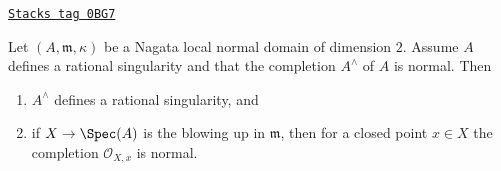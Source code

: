 \begin{lemma}
\label{resolve-lemma-blowup-still-good}
\href{https://stacks.math.columbia.edu/tag/0BG7}{\texttt{Stacks tag 0BG7}}

Let $(A, \mathfrak m, \kappa)$ be a Nagata local normal domain of
dimension $2$. Assume $A$ defines a rational singularity and that
the completion $A^\wedge$ of $A$ is normal. Then
\begin{enumerate}
\item $A^\wedge$ defines a rational singularity, and
\item if $X \to \Spec(A)$ is the blowing up in $\mathfrak m$, then
for a closed point $x \in X$ the completion $\mathcal{O}_{X, x}$ is normal.
\end{enumerate}
\end{lemma}

